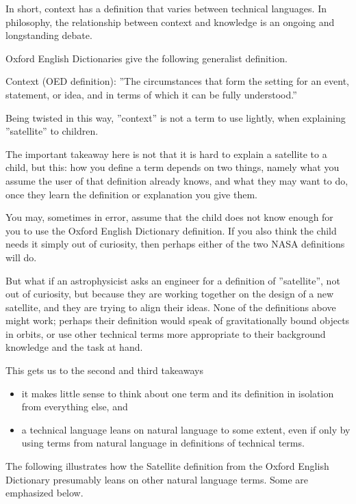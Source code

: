 In short, context has a definition that varies between technical languages. In philosophy, the relationship between context and knowledge is an ongoing and longstanding debate.\cite{Rysiew2016}

Oxford English Dictionaries give the following generalist definition.

\begin{svgraybox}
Context (OED definition): ''The circumstances that form the setting for an event, statement, or idea, and in terms of which it can be fully understood.'' \cite{def-context}
\end{svgraybox}

Being twisted in this way, ''context'' is not a term to use lightly, when explaining ''satellite'' to children.

The important takeaway here is not that it is hard to explain a satellite to a child, but this: how you define a term depends on two things, namely
what you assume the user of that definition already knows, and
what they may want to do, once they learn the definition or explanation you give them.

You may, sometimes in error, assume that the child does not know enough for you to use the Oxford English Dictionary definition. If you also think the child needs it simply out of curiosity, then perhaps either of the two NASA definitions will do.

But what if an astrophysicist asks an engineer for a definition of ''satellite'', not out of curiosity, but because they are working together on the design of a new satellite, and they are trying to align their ideas. None of the definitions above might work; perhaps their definition would speak of gravitationally bound objects in orbits, or use other technical terms more appropriate to their background knowledge and the task at hand.

This gets us to the second and third takeaways
\begin{itemize}
	\item it makes little sense to think about one term and its definition in isolation from everything else, and
	\item a technical language leans on natural language to some extent, even if only by using terms from natural language in definitions of technical terms.
\end{itemize}

The following illustrates how the Satellite definition from the Oxford English Dictionary presumably leans on other natural language terms. Some are emphasized below.

